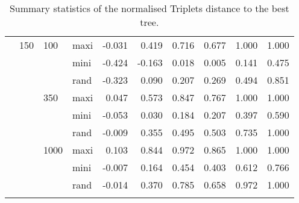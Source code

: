 \begin{longtable}{llllrrrrrr}
   & 150 & 100 & maxi & -0.031 & 0.419 & 0.716 & 0.677 & 1.000 & 1.000 \\ 
   &  &  & mini & -0.424 & -0.163 & 0.018 & 0.005 & 0.141 & 0.475 \\ 
   &  &  & rand & -0.323 & 0.090 & 0.207 & 0.269 & 0.494 & 0.851 \\ 
   &  & 350 & maxi & 0.047 & 0.573 & 0.847 & 0.767 & 1.000 & 1.000 \\ 
   &  &  & mini & -0.053 & 0.030 & 0.184 & 0.207 & 0.397 & 0.590 \\ 
   &  &  & rand & -0.009 & 0.355 & 0.495 & 0.503 & 0.735 & 1.000 \\ 
   &  & 1000 & maxi & 0.103 & 0.844 & 0.972 & 0.865 & 1.000 & 1.000 \\ 
   &  &  & mini & -0.007 & 0.164 & 0.454 & 0.403 & 0.612 & 0.766 \\ 
   &  &  & rand & -0.014 & 0.370 & 0.785 & 0.658 & 0.972 & 1.000 \\ 
   \hline
\hline
\caption{Summary statistics of the normalised Triplets distance to the best tree.} 
\label{Full_Tab_SummaryTrbest}
\end{longtable}
